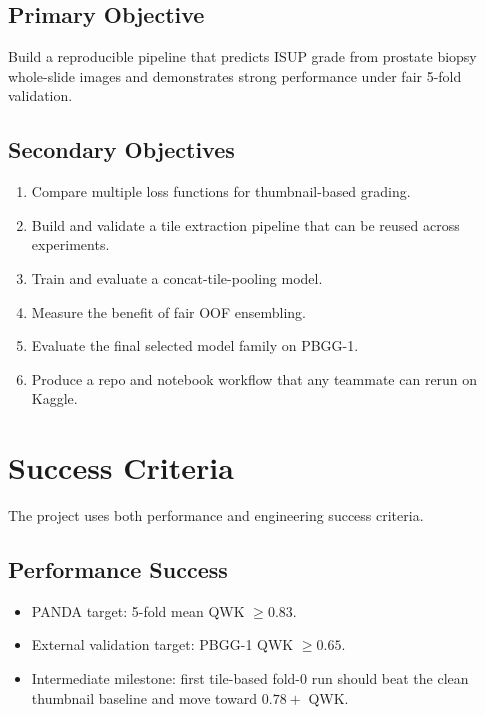 \documentclass[11pt]{article}
\begin{document}
\subsection{Primary Objective}

Build a reproducible pipeline that predicts ISUP grade from prostate biopsy whole-slide images and demonstrates strong performance under fair 5-fold validation.

\subsection{Secondary Objectives}

\begin{enumerate}[leftmargin=*]
    \item Compare multiple loss functions for thumbnail-based grading.
    \item Build and validate a tile extraction pipeline that can be reused across experiments.
    \item Train and evaluate a concat-tile-pooling model.
    \item Measure the benefit of fair OOF ensembling.
    \item Evaluate the final selected model family on PBGG-1.
    \item Produce a repo and notebook workflow that any teammate can rerun on Kaggle.
\end{enumerate}

\section{Success Criteria}

The project uses both performance and engineering success criteria.

\subsection{Performance Success}

\begin{itemize}[leftmargin=*]
    \item PANDA target: 5-fold mean QWK $\geq 0.83$.
    \item External validation target: PBGG-1 QWK $\geq 0.65$.
    \item Intermediate milestone: first tile-based fold-0 run should beat the clean thumbnail baseline and move toward $0.78+$ QWK.
\end{itemize}
\end{document}
